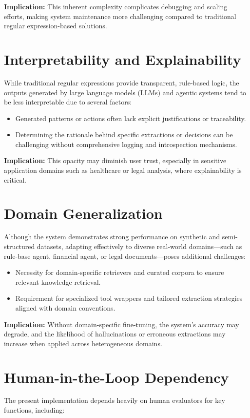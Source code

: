 \noindent
\textbf{Implication:} This inherent complexity complicates debugging and scaling efforts, making system maintenance more challenging compared to traditional regular expression-based solutions.


\section{Interpretability and Explainability}
While traditional regular expressions provide transparent, rule-based logic, the outputs generated by large language models (LLMs) and agentic systems tend to be less interpretable due to several factors:

\begin{itemize}
    \item Generated patterns or actions often lack explicit justifications or traceability.
    \item Determining the rationale behind specific extractions or decisions can be challenging without comprehensive logging and introspection mechanisms.
\end{itemize}

\noindent
\textbf{Implication:} This opacity may diminish user trust, especially in sensitive application domains such as healthcare or legal analysis, where explainability is critical.


\section{Domain Generalization}
Although the system demonstrates strong performance on synthetic and semi-structured datasets, adapting effectively to diverse real-world domains—such as rule-base agent, financial agent, or legal documents—poses additional challenges:

\begin{itemize}
    \item Necessity for domain-specific retrievers and curated corpora to ensure relevant knowledge retrieval.
    \item Requirement for specialized tool wrappers and tailored extraction strategies aligned with domain conventions.
\end{itemize}

\noindent
\textbf{Implication:} Without domain-specific fine-tuning, the system’s accuracy may degrade, and the likelihood of hallucinations or erroneous extractions may increase when applied across heterogeneous domains.


\section{Human-in-the-Loop Dependency}
The present implementation depends heavily on human evaluators for key functions, including:


